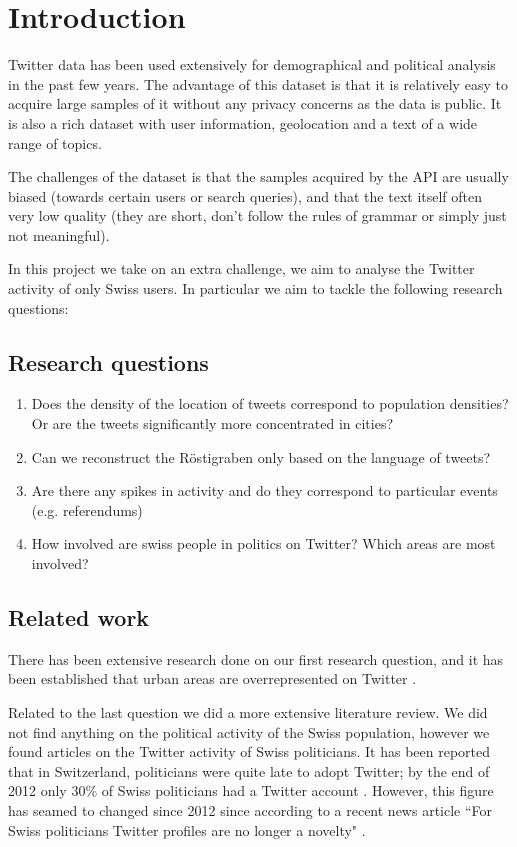 \section{Introduction}

Twitter data has been used extensively for demographical and political analysis in the past few years. The advantage of this dataset is that it is relatively easy to acquire large samples of it without any privacy concerns as the data is public. It is also a rich dataset with user information, geolocation and a text of a wide range of topics. 

The challenges of the dataset is that the samples acquired by the API are usually biased (towards certain users or search queries), and that the text itself often very low quality (they are short, don't follow the rules of grammar or simply just not meaningful).

In this project we take on an extra challenge, we aim to analyse the Twitter activity of only Swiss users. In particular we aim to tackle the following research questions:

\subsection{Research questions}
\begin{enumerate}
\item Does the density of the location of tweets correspond to population densities? Or are the tweets significantly more concentrated in cities?
\item Can we reconstruct the R\"ostigraben only based on the language of tweets?
\item Are there any spikes in activity and do they correspond to particular events (e.g. referendums)
\item How involved are swiss people in politics on Twitter? Which areas are most involved?
\end{enumerate}

\subsection{Related work}

There has been extensive research done on our first research question, and it has been established that urban areas are overrepresented on Twitter \cite{mislove2011understanding}.

Related to the last question we did a more extensive literature review. We did not find anything on the political activity of the Swiss population, however we found articles on the Twitter activity of Swiss politicians. It has been reported that in Switzerland, politicians were quite late to adopt Twitter; by the end of 2012 only 30\% of Swiss politicians had a Twitter account \cite{rauchfleisch_special_2016}. However, this figure has seamed to changed since 2012 since according to a recent news article ``For Swiss politicians Twitter profiles are no longer a novelty" \cite{fichter_swiss_nodate}.

